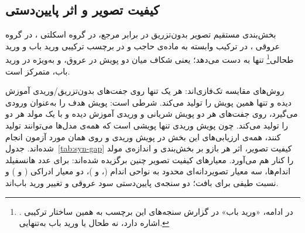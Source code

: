 
\subsection{کیفیت تصویر و اثر پایین‌دستی}

بخش‌بندی مستقیم تصویر بدون‌تزریق در برابر مرجع، در گروه اسکلتی  ، در گروه عروقی ، در ترکیب وابسته به ماده‌ی حاجب  و در برچسب ترکیبی ورید باب و ورید طحالی\footnote{. در ادامه، «ورید باب» در گزارش سنجه‌های این برچسب به همین ساختار ترکیبی اشاره دارد، نه طحال یا ورید باب به‌تنهایی.} تنها  به دست می‌دهد؛ یعنی شکاف میان دو پویش در عروق، و به‌ویژه در ورید باب، متمرکز است.

روش‌های مقایسه تک‌فازی‌اند: هر یک تنها روی جفت‌های بدون‌تزریق/وریدی آموزش دیده و تنها همین پویش را تولید می‌کند.  شرطی است: پویش هدف را به‌عنوان ورودی می‌گیرد، روی جفت‌های هر دو پویش شریانی و وریدی آموزش دیده و با یک مولد هر دو را تولید می‌کند. چون پویش وریدی تنها پویشی است که همه‌ی مدل‌ها می‌توانند تولید کنند، همه‌ی ارزیابی‌های این بخش در پویش وریدی و روی همان  مورد آزمون انجام شده‌اند. جدول~\ref{tab:syn-gap} کیفیت تصویر، اثر هر بازو بر بخش‌بندی و اندازه‌ی مولد را کنار هم می‌آورد. معیارهای کیفیت تصویر چنین برگزیده شده‌اند:  برای عدد هانسفیلد اندام‌ها، سه معیار تصویردانه‌ای محدود به نواحی اندام (،  و )، دو معیار ادراکی ( و ) و نسبت طیفی  برای بافت؛ دو سنجه‌ی پایین‌دستی سود عروقی و تغییر  ورید باب‌اند.

